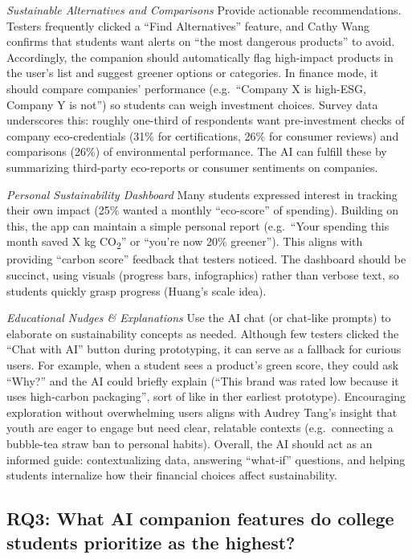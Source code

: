 \documentclass[
  12pt,
  letterpaper,
  DIV=11,
  numbers=noendperiod]{scrartcl}
\begin{document}
\emph{Sustainable Alternatives and Comparisons} Provide actionable
recommendations. Testers frequently clicked a ``Find Alternatives''
feature, and Cathy Wang confirms that students want alerts on ``the most
dangerous products'' to avoid. Accordingly, the companion should
automatically flag high-impact products in the user's list and suggest
greener options or categories. In finance mode, it should compare
companies' performance (e.g.~``Company X is high-ESG, Company Y is
not'') so students can weigh investment choices. Survey data underscores
this: roughly one-third of respondents want pre-investment checks of
company eco-credentials (31\% for certifications, 26\% for consumer
reviews) and comparisons (26\%) of environmental performance. The AI can
fulfill these by summarizing third-party eco-reports or consumer
sentiments on companies.

\emph{Personal Sustainability Dashboard} Many students expressed
interest in tracking their own impact (25\% wanted a monthly
``eco-score'' of spending). Building on this, the app can maintain a
simple personal report (e.g.~``Your spending this month saved X kg
CO\textsubscript{2}'' or ``you're now 20\% greener''). This aligns with
providing ``carbon score'' feedback that testers noticed. The dashboard
should be succinct, using visuals (progress bars, infographics) rather
than verbose text, so students quickly grasp progress (Huang's scale
idea).

\emph{Educational Nudges \& Explanations} Use the AI chat (or chat-like
prompts) to elaborate on sustainability concepts as needed. Although few
testers clicked the ``Chat with AI'' button during prototyping, it can
serve as a fallback for curious users. For example, when a student sees
a product's green score, they could ask ``Why?'' and the AI could
briefly explain (``This brand was rated low because it uses high-carbon
packaging'', sort of like in ther earliest prototype). Encouraging
exploration without overwhelming users aligns with Audrey Tang's insight
that youth are eager to engage but need clear, relatable contexts
(e.g.~connecting a bubble-tea straw ban to personal habits). Overall,
the AI should act as an informed guide: contextualizing data, answering
``what-if'' questions, and helping students internalize how their
financial choices affect sustainability.

\subsection{RQ3: What AI companion features do college students
prioritize as the
highest?}\label{rq3-what-ai-companion-features-do-college-students-prioritize-as-the-highest}
\end{document}
